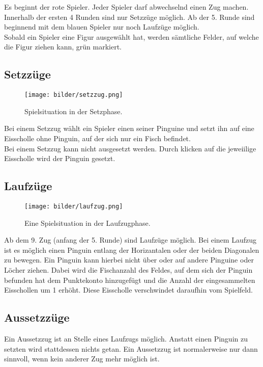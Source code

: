 \documentclass[a4paper, ngerman]{scrartcl}
\begin{document}
	Es beginnt der rote Spieler. Jeder Spieler darf abwechselnd einen
	Zug machen. Innerhalb der ersten 4 Runden sind nur Setzzüge möglich. Ab der
	5.
	Runde sind beginnend mit dem blauen Spieler nur noch Laufzüge möglich.\\
	Sobald ein Spieler eine Figur ausgewählt hat, werden sämtliche Felder, auf
	welche die Figur ziehen kann, grün markiert.
	
	
	
	\subsection{Setzzüge}
	
	\begin{figure}[h!]
		\centering
		\texttt{[image: bilder/setzzug.png]}
		\caption{Spielsituation in der Setzphase.}
		\label{fig:Setzzug}
	\end{figure}
	Bei einem Setzzug wählt ein Spieler einen seiner
	Pinguine und setzt ihn auf eine Eisscholle ohne Pinguin, auf der sich nur ein
	Fisch befindet.\\
	Bei einem Setzzug kann nicht ausgesetzt werden. Durch klicken auf die
	jeweiilige Eisscholle wird der Pinguin gesetzt. 
	
	
	 
\subsection{Laufzüge}
	 
	\begin{figure}[h!]
		\centering
		\texttt{[image: bilder/laufzug.png]}
		\caption{Eine Spielsituation in der Laufzugphase.}
		\label{fig:Laufzug}
	\end{figure}
	
Ab dem 9. Zug (anfang der 5. Runde) sind Laufzüge möglich. Bei einem Laufzug
ist es möglich einen Pinguin entlang der Horizantalen oder der beiden Diagonalen
zu bewegen. Ein Pinguin kann hierbei nicht über oder auf andere Pinguine oder
Löcher ziehen. Dabei wird die Fischanzahl des Feldes, auf dem sich der Pinguin
befunden hat dem Punktekonto hinzugefügt und die Anzahl der eingesammelten 
Eisschollen um 1 erhöht. Diese Eisscholle verschwindet daraufhin vom Spielfeld.



\subsection{Aussetzzüge}
Ein Aussetzzug ist an Stelle eines Laufzugs möglich. Anstatt einen Pinguin zu 
setzten wird stattdessen nichts getan. Ein Aussetzzug ist normalerweise nur dann
sinnvoll, wenn kein anderer Zug mehr möglich ist.
	
\end{document}
